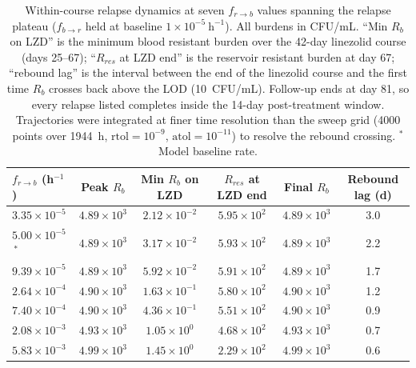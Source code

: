\documentclass[12pt, draftcls, onecolumn]{IEEEtran}
\begin{document}
\begin{table}[H]
    \centering
    \begin{tabular}{lccccc}
        \hline
        $f_{r \to b}$ (h$^{-1}$) & Peak $R_b$ & Min $R_b$ on LZD
            & $R_{res}$ at LZD end & Final $R_b$ & Rebound lag (d) \\
        \hline
        $3.35\times10^{-5}$          & $4.89\times10^{3}$ & $2.12\times10^{-2}$ & $5.95\times10^{2}$ & $4.89\times10^{3}$ & 3.0 \\
        $5.00\times10^{-5}$\,$^{*}$  & $4.89\times10^{3}$ & $3.17\times10^{-2}$ & $5.93\times10^{2}$ & $4.89\times10^{3}$ & 2.2 \\
        $9.39\times10^{-5}$          & $4.89\times10^{3}$ & $5.92\times10^{-2}$ & $5.91\times10^{2}$ & $4.89\times10^{3}$ & 1.7 \\
        $2.64\times10^{-4}$          & $4.90\times10^{3}$ & $1.63\times10^{-1}$ & $5.80\times10^{2}$ & $4.90\times10^{3}$ & 1.2 \\
        $7.40\times10^{-4}$          & $4.90\times10^{3}$ & $4.36\times10^{-1}$ & $5.51\times10^{2}$ & $4.90\times10^{3}$ & 0.9 \\
        $2.08\times10^{-3}$          & $4.93\times10^{3}$ & $1.05\times10^{0}$  & $4.68\times10^{2}$ & $4.93\times10^{3}$ & 0.7 \\
        $5.83\times10^{-3}$          & $4.99\times10^{3}$ & $1.45\times10^{0}$  & $2.29\times10^{2}$ & $4.99\times10^{3}$ & 0.6 \\
        \hline
    \end{tabular}
    \caption{Within-course relapse dynamics at seven $f_{r \to b}$ values
    spanning the relapse plateau ($f_{b \to r}$ held at baseline
    $1\times10^{-5}~\mathrm{h}^{-1}$). All burdens in CFU/mL. ``Min $R_b$ on
    LZD'' is the minimum blood resistant burden over the 42-day linezolid
    course (days 25--67); ``$R_{res}$ at LZD end'' is the reservoir resistant
    burden at day 67; ``rebound lag'' is the interval between the end of the
    linezolid course and the first time $R_b$ crosses back above the LOD
    (10~CFU/mL). Follow-up ends at day 81, so every relapse listed completes
    inside the 14-day post-treatment window. Trajectories were integrated at
    finer time resolution than the sweep grid (4000 points over 1944~h,
    $\mathrm{rtol}=10^{-9}$, $\mathrm{atol}=10^{-11}$) to resolve the rebound
    crossing. $^{*}$Model baseline rate.}
    \label{tab:frb_plateau_relapse}
\end{table}
\end{document}
